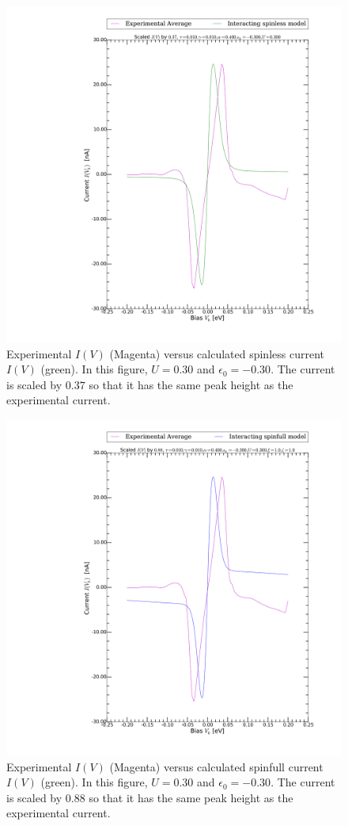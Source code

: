 \begin{figure}[htb]
    \centering
    \includegraphics[width=.95\textwidth, clip=true, trim=11cm 2cm 2cm 0cm]{pdf/fit/fit_spinless_5.pdf}
    \caption{Experimental $I(V)$ (Magenta) versus calculated spinless current $I(V)$ (green). In this figure, $U=0.30$ and $\epsilon_0 = -0.30$. The current is scaled by $0.37$ so that it has the same peak height as the experimental current.}
    \label{fig:fitspinless5}
\end{figure} 
\begin{figure}[htb]
    \centering
    \includegraphics[width=.95\textwidth, clip=true, trim=11cm 2cm 2cm 0cm]{pdf/fit/fit_spinfull_1.pdf}
    \caption{Experimental $I(V)$ (Magenta) versus calculated spinfull current $I(V)$ (green). In this figure, $U=0.30$ and $\epsilon_0 = -0.30$. The current is scaled by $0.88$ so that it has the same peak height as the experimental current.}
    \label{fig:fitspinfull1}
\end{figure} 

